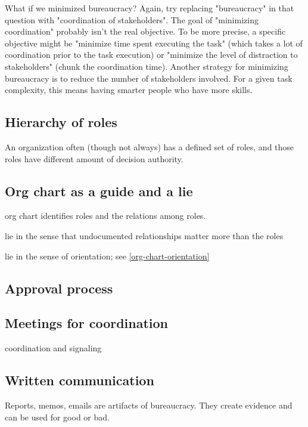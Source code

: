 What if we minimized bureaucracy? Again, try replacing "bureaucracy" in that question with "coordination of stakeholders". The goal of "minimizing coordination" probably isn't the real objective. To be more precise, a specific objective might be "minimize time spent executing the task" (which takes a lot of coordination prior to the task execution) or "minimize the level of distraction to stakeholders" (chunk the coordination time). Another strategy for minimizing bureaucracy is to reduce the number of stakeholders involved. For a given task complexity, this means having smarter people who have more skills. 


\subsection{Hierarchy of roles}

An \gls{organization} often (though not always) has a defined set of roles, and those roles have different amount of decision authority. 

\subsection{Org chart as a guide and a lie}

org chart identifies roles and the relations among roles. 

lie in the sense that undocumented relationships matter more than the roles

lie in the sense of orientation; see \ref{org-chart-orientation}

\subsection{Approval process}

\subsection{Meetings for coordination}

coordination and signaling

\subsection{Written communication}

Reports, memos, emails are artifacts of bureaucracy. They create evidence and can be used for good or bad. 

